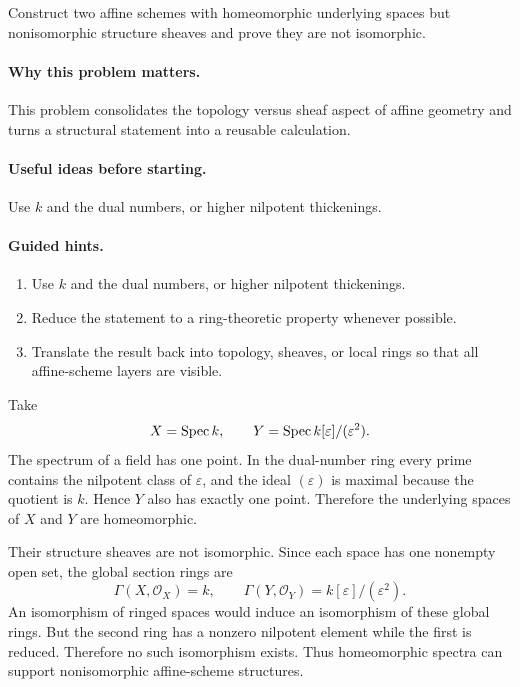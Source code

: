 \begin{problem}\label{prob:vi18-p18}
Construct two affine schemes with homeomorphic underlying spaces but nonisomorphic structure sheaves and prove they are not isomorphic.
\end{problem}

\ifdefined\FullProblemDossiers
\paragraph{Why this problem matters.}
This problem consolidates the topology versus sheaf aspect of affine geometry and turns a structural statement into a reusable calculation.

\paragraph{Useful ideas before starting.}
Use $k$ and the dual numbers, or higher nilpotent thickenings.

\paragraph{Guided hints.}
\begin{enumerate}
\item Use $k$ and the dual numbers, or higher nilpotent thickenings.
\item Reduce the statement to a ring-theoretic property whenever possible.
\item Translate the result back into topology, sheaves, or local rings so that all affine-scheme layers are visible.
\end{enumerate}

\begin{solution}
Take
\[
X=\operatorname{Spec} k,
\qquad
Y=\operatorname{Spec} k[\varepsilon]/(\varepsilon^2).
\]
The spectrum of a field has one point. In the dual-number ring every prime contains the nilpotent class of $\varepsilon$, and the ideal $(\varepsilon)$ is maximal because the quotient is $k$. Hence $Y$ also has exactly one point. Therefore the underlying spaces of $X$ and $Y$ are homeomorphic.

Their structure sheaves are not isomorphic. Since each space has one nonempty open set, the global section rings are
\[
\Gamma(X,\mathcal O_X)=k,
\qquad
\Gamma(Y,\mathcal O_Y)=k[\varepsilon]/(\varepsilon^2).
\]
An isomorphism of ringed spaces would induce an isomorphism of these global rings. But the second ring has a nonzero nilpotent element while the first is reduced. Therefore no such isomorphism exists. Thus homeomorphic spectra can support nonisomorphic affine-scheme structures.
\end{solution}


